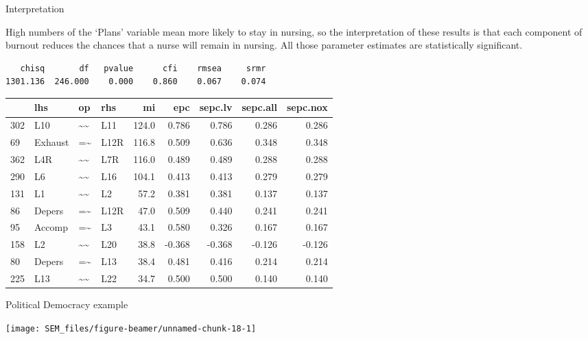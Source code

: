 \documentclass[10pt,ignorenonframetext,]{beamer}
\begin{document}
\begin{frame}[fragile]{Interpretation}

High numbers of the `Plans' variable mean more likely to stay in
nursing, so the interpretation of these results is that each component
of burnout reduces the chances that a nurse will remain in nursing. All
those parameter estimates are statistically significant.

\begin{verbatim}
   chisq       df   pvalue      cfi    rmsea     srmr 
1301.136  246.000    0.000    0.860    0.067    0.074 
\end{verbatim}

\tiny

\begin{longtable}[]{@{}llllrrrrr@{}}
\toprule
& lhs & op & rhs & mi & epc & sepc.lv & sepc.all &
sepc.nox\tabularnewline
\midrule
\endhead
302 & L10 & \textasciitilde{}\textasciitilde{} & L11 & 124.0 & 0.786 &
0.786 & 0.286 & 0.286\tabularnewline
69 & Exhaust & =\textasciitilde{} & L12R & 116.8 & 0.509 & 0.636 & 0.348
& 0.348\tabularnewline
362 & L4R & \textasciitilde{}\textasciitilde{} & L7R & 116.0 & 0.489 &
0.489 & 0.288 & 0.288\tabularnewline
290 & L6 & \textasciitilde{}\textasciitilde{} & L16 & 104.1 & 0.413 &
0.413 & 0.279 & 0.279\tabularnewline
131 & L1 & \textasciitilde{}\textasciitilde{} & L2 & 57.2 & 0.381 &
0.381 & 0.137 & 0.137\tabularnewline
86 & Depers & =\textasciitilde{} & L12R & 47.0 & 0.509 & 0.440 & 0.241 &
0.241\tabularnewline
95 & Accomp & =\textasciitilde{} & L3 & 43.1 & 0.580 & 0.326 & 0.167 &
0.167\tabularnewline
158 & L2 & \textasciitilde{}\textasciitilde{} & L20 & 38.8 & -0.368 &
-0.368 & -0.126 & -0.126\tabularnewline
80 & Depers & =\textasciitilde{} & L13 & 38.4 & 0.481 & 0.416 & 0.214 &
0.214\tabularnewline
225 & L13 & \textasciitilde{}\textasciitilde{} & L22 & 34.7 & 0.500 &
0.500 & 0.140 & 0.140\tabularnewline
\bottomrule
\end{longtable}

\end{frame}

\begin{frame}{Political Democracy example}

\begin{center}\texttt{[image: SEM\_files/figure-beamer/unnamed-chunk-18-1]} \end{center}

\end{frame}
\end{document}
